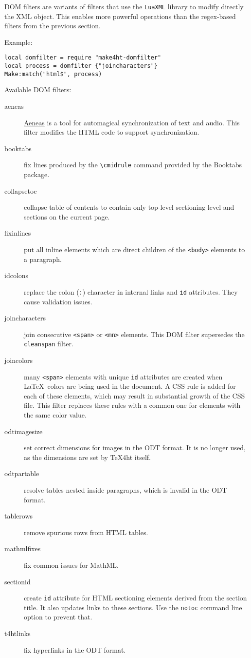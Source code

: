 DOM filters are variants of filters that use the
\href{https://ctan.org/pkg/luaxml}{\texttt{LuaXML}} library to modify
directly the XML object. This enables more powerful operations than the
regex-based filters from the previous section.

Example:

\begin{verbatim}
local domfilter = require "make4ht-domfilter"
local process = domfilter {"joincharacters"}
Make:match("html$", process)
\end{verbatim}

Available DOM filters:

\begin{description}
\item[aeneas]
\href{https://www.readbeyond.it/aeneas/}{Aeneas} is a tool for
automagical synchronization of text and audio. This filter modifies the
HTML code to support synchronization.
\item[booktabs]
fix lines produced by the \texttt{\textbackslash{}cmidrule} command
provided by the Booktabs package.
\item[collapsetoc]
collapse table of contents to contain only top-level sectioning level
and sections on the current page.
\item[fixinlines]
put all inline elements which are direct children of the
\texttt{\textless{}body\textgreater{}} elements to a paragraph.
\item[idcolons]
replace the colon (\texttt{:}) character in internal links and
\texttt{id} attributes. They cause validation issues.
\item[joincharacters]
join consecutive \texttt{\textless{}span\textgreater{}} or
\texttt{\textless{}mn\textgreater{}} elements. This DOM filter
supersedes the \texttt{cleanspan} filter.
\item[joincolors]
many \texttt{\textless{}span\textgreater{}} elements with unique
\texttt{id} attributes are created when \LaTeX~colors are being used in
the document. A CSS rule is added for each of these elements, which may
result in substantial growth of the CSS file. This filter replaces these
rules with a common one for elements with the same color value.
\item[odtimagesize]
set correct dimensions for images in the ODT format. It is no longer
used, as the dimensions are set by TeX4ht itself.
\item[odtpartable]
resolve tables nested inside paragraphs, which is invalid in the ODT
format.
\item[tablerows]
remove spurious rows from HTML tables.
\item[mathmlfixes]
fix common issues for MathML.
\item[sectionid]
create \texttt{id} attribute for HTML sectioning elements derived from
the section title. It also updates links to these sections. Use the
\texttt{notoc} command line option to prevent that.
\item[t4htlinks]
fix hyperlinks in the ODT format.
\end{description}


